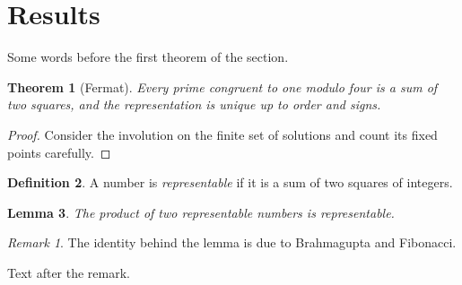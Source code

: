 \documentclass{amsart}
\newtheorem{theorem}{Theorem}[section]
\newtheorem{lemma}[theorem]{Lemma}
\theoremstyle{definition}
\newtheorem{definition}[theorem]{Definition}
\theoremstyle{remark}
\newtheorem*{remark}{Remark}
\begin{document}
\vspace*{1cm}
\section{Results}
Some words before the first theorem of the section.
\begin{theorem}[Fermat]
Every prime congruent to one modulo four is a sum of two squares, and the representation is unique up to order and signs.
\end{theorem}
\begin{proof}
Consider the involution on the finite set of solutions and count its fixed points carefully.
\end{proof}
\begin{definition}
A number is \emph{representable} if it is a sum of two squares of integers.
\end{definition}
\begin{lemma}
The product of two representable numbers is representable.
\end{lemma}
\begin{remark}
The identity behind the lemma is due to Brahmagupta and Fibonacci.
\end{remark}
Text after the remark.
\end{document}
